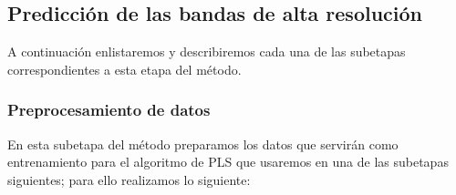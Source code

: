 \subsection{Predicción de las bandas de alta resolución}

A continuación enlistaremos y describiremos cada una de las subetapas correspondientes a esta etapa del método.

\subsubsection{Preprocesamiento de datos}

En esta subetapa del método preparamos los datos que servirán como entrenamiento para el algoritmo de PLS que usaremos en una de las subetapas siguientes; para ello realizamos lo siguiente: 

